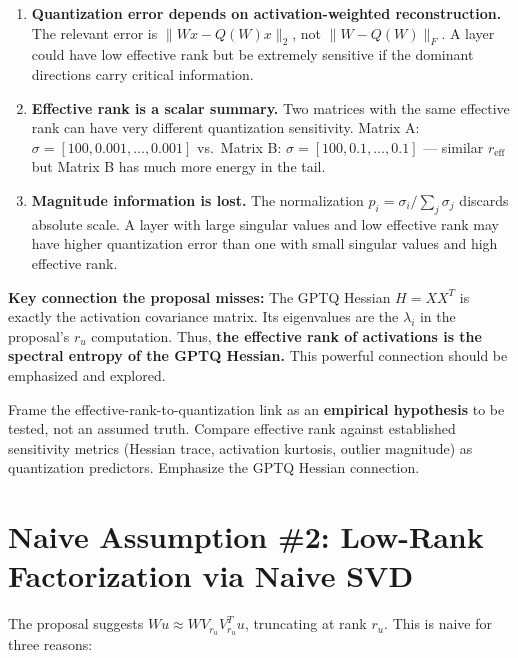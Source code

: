 \documentclass[11pt,a4paper]{article}
\begin{document}
\begin{enumerate}[label=(\roman*)]
    \item \textbf{Quantization error depends on activation-weighted reconstruction.} The relevant error is $\|Wx - Q(W)x\|_2$, not $\|W - Q(W)\|_F$. A layer could have low effective rank but be extremely sensitive if the dominant directions carry critical information.

    \item \textbf{Effective rank is a scalar summary.} Two matrices with the same effective rank can have very different quantization sensitivity. Matrix A: $\sigma = [100, 0.001, \ldots, 0.001]$ vs.\ Matrix B: $\sigma = [100, 0.1, \ldots, 0.1]$ --- similar $r_{\text{eff}}$ but Matrix B has much more energy in the tail.

    \item \textbf{Magnitude information is lost.} The normalization $p_i = \sigma_i / \sum_j \sigma_j$ discards absolute scale. A layer with large singular values and low effective rank may have higher quantization error than one with small singular values and high effective rank.
\end{enumerate}

\begin{insightbox}
\textbf{Key connection the proposal misses:} The GPTQ Hessian $H = XX^T$ is exactly the activation covariance matrix. Its eigenvalues are the $\lambda_i$ in the proposal's $r_u$ computation. Thus, \textbf{the effective rank of activations is the spectral entropy of the GPTQ Hessian.} This powerful connection should be emphasized and explored.
\end{insightbox}

\begin{fixbox}
Frame the effective-rank-to-quantization link as an \textbf{empirical hypothesis} to be tested, not an assumed truth. Compare effective rank against established sensitivity metrics (Hessian trace, activation kurtosis, outlier magnitude) as quantization predictors. Emphasize the GPTQ Hessian connection.
\end{fixbox}

\section{Naive Assumption \#2: Low-Rank Factorization via Naive SVD}

The proposal suggests $Wu \approx W V_{r_u} V_{r_u}^T u$, truncating at rank $r_u$. This is naive for three reasons:
\end{document}
